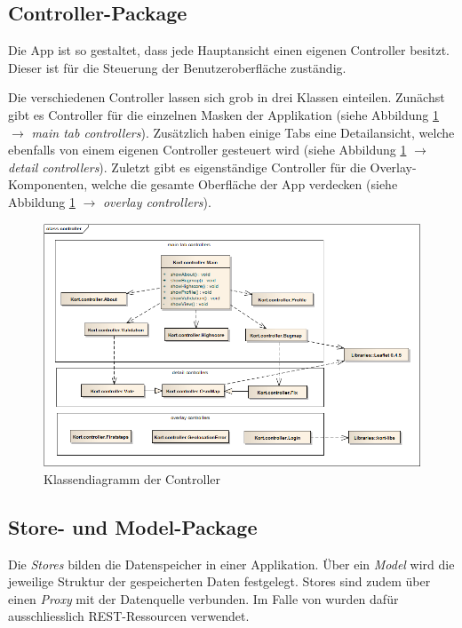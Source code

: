 \subsection{Controller-Package}

Die App ist so gestaltet, dass jede Hauptansicht einen eigenen Controller besitzt.
Dieser ist für die Steuerung der Benutzeroberfläche zuständig.

Die verschiedenen Controller lassen sich grob in drei Klassen einteilen.
Zunächst gibt es Controller für die einzelnen Masken der Applikation (siehe Abbildung \ref{image-kort-classdiagram-controller} $\rightarrow$ \emph{main tab controllers}).
Zusätzlich haben einige Tabs eine Detailansicht, welche ebenfalls von einem eigenen Controller gesteuert wird (siehe Abbildung \ref{image-kort-classdiagram-controller} $\rightarrow$ \emph{detail controllers}).
Zuletzt gibt es eigenständige Controller für die Overlay-Komponenten, welche die gesamte Oberfläche der App verdecken (siehe Abbildung \ref{image-kort-classdiagram-controller} $\rightarrow$ \emph{overlay controllers}).

\begin{figure}[H]
	\centering
	\includegraphics[width=\textwidth]{images/uml/kort-classdiagram-controller}
	\caption{Klassendiagramm der Controller}
	\label{image-kort-classdiagram-controller}
\end{figure}

\subsection{Store- und Model-Package}
\label{kort-store-model-package}

Die \emph{Stores} bilden die Datenspeicher in einer  Applikation.
Über ein \emph{Model} wird die jeweilige Struktur der gespeicherten Daten festgelegt.
Stores sind zudem über einen \emph{Proxy} mit der Datenquelle verbunden.
Im Falle von \kort{} wurden dafür ausschliesslich \gls{REST}-Ressourcen verwendet.

